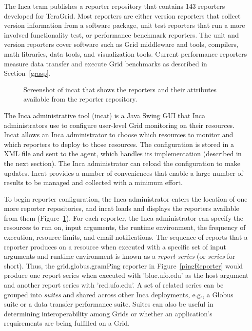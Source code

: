 \documentclass[times,10pt,twocolumn]{article}
\begin{document}
The Inca team publishes a reporter repository that contains 143 reporters
developed for TeraGrid.  Most reporters are either version
reporters that collect version information from a software package,
unit test reporters that run a more involved
functionality test, or performance benchmark reporters.  The unit and version
reporters cover software such as Grid middleware and tools, compilers, math libraries,
data tools, and visualization tools.  Current performance reporters
measure data transfer and execute Grid benchmarks as described in
Section~\ref{grasp}.


\begin{figure}[tbp]
  \centering
  \mbox{}
  \caption{\label{incat_fig} Screenshot of incat that shows the reporters
  and their attributes available from the reporter repository.}
\end{figure}

The Inca administrative tool (incat) is a Java Swing GUI that
Inca administrators use to configure user-level Grid monitoring on their
resources.  Incat allows an Inca administrator to choose which resources to
monitor and which reporters to deploy to those resources.  The configuration
is stored in a XML file and sent to the agent, which handles its implementation
(described in the next section).  The Inca administrator can reload the
configuration to make updates.  Incat provides a number of
conveniences that enable a large number of results to be managed and collected
with a minimum effort.  

To begin reporter configuration, the Inca administrator enters the location of
one more reporter repositories, and incat loads and displays the reporters
available from them (Figure~\ref{incat_fig}).
For each reporter, the Inca administrator can specify the resources to run on,
input arguments, the runtime environment, the frequency of execution, resource
limits, and email notifications.  The sequence of reports that a reporter
produces on a resource when executed with a specific set of input arguments and
runtime environment is known as a \emph{report series} (or \emph{series} for
short).
Thus, the grid.globus.gramPing reporter in Figure~\ref{pingReporter} would
produce one report series when executed with 'blue.ufo.edu' as the host argument and another report series with 'red.ufo.edu'.  A set of related
series can be grouped into \emph{suites} and shared across other Inca
deployments, e.g.,  a Globus suite or a data transfer
performance suite.  Suites can also be useful in determining interoperability
among Grids or whether an application's requirements are being
fulfilled on a Grid.
\end{document}
